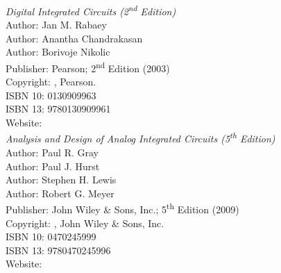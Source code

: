 
\begin{thebibliography}{9}


\emph{Digital Integrated Circuits (2\textsuperscript{nd} Edition)}\\
Author: Jan M. Rabaey\\
Author: Anantha Chandrakasan\\
Author: Borivoje Nikolic\\
Publisher: Pearson; 2\textsuperscript{nd} Edition (2003)\\
Copyright: \textcopyright {}, Pearson.\\
ISBN 10: 0130909963\\
ISBN 13: 9780130909961\\
Website: \\



\emph{Analysis and Design of Analog Integrated Circuits (5\textsuperscript{th} Edition)}\\
Author: Paul R. Gray\\
Author: Paul J. Hurst\\
Author: Stephen H. Lewis\\
Author: Robert G. Meyer\\
Publisher: John Wiley \& Sons, Inc.; 5\textsuperscript{th} Edition (2009)\\
Copyright: \textcopyright {}, John Wiley \& Sons, Inc.\\
ISBN 10: 0470245999\\
ISBN 13: 9780470245996\\
Website: \\





\end{thebibliography}